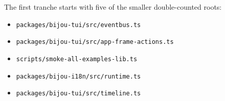The first tranche starts with five of the smaller double-counted roots:

\begin{itemize}
\tightlist
\item
  \texttt{p\allowbreak{}a\allowbreak{}c\allowbreak{}k\allowbreak{}a\allowbreak{}g\allowbreak{}e\allowbreak{}s\allowbreak{}/\allowbreak{}b\allowbreak{}i\allowbreak{}j\allowbreak{}o\allowbreak{}u\allowbreak{}-\allowbreak{}t\allowbreak{}u\allowbreak{}i\allowbreak{}/\allowbreak{}s\allowbreak{}r\allowbreak{}c\allowbreak{}/\allowbreak{}e\allowbreak{}v\allowbreak{}e\allowbreak{}n\allowbreak{}t\allowbreak{}b\allowbreak{}u\allowbreak{}s\allowbreak{}.\allowbreak{}t\allowbreak{}s}
\item
  \texttt{p\allowbreak{}a\allowbreak{}c\allowbreak{}k\allowbreak{}a\allowbreak{}g\allowbreak{}e\allowbreak{}s\allowbreak{}/\allowbreak{}b\allowbreak{}i\allowbreak{}j\allowbreak{}o\allowbreak{}u\allowbreak{}-\allowbreak{}t\allowbreak{}u\allowbreak{}i\allowbreak{}/\allowbreak{}s\allowbreak{}r\allowbreak{}c\allowbreak{}/\allowbreak{}a\allowbreak{}p\allowbreak{}p\allowbreak{}-\allowbreak{}f\allowbreak{}r\allowbreak{}a\allowbreak{}m\allowbreak{}e\allowbreak{}-\allowbreak{}a\allowbreak{}c\allowbreak{}t\allowbreak{}i\allowbreak{}o\allowbreak{}n\allowbreak{}s\allowbreak{}.\allowbreak{}t\allowbreak{}s}
\item
  \texttt{s\allowbreak{}c\allowbreak{}r\allowbreak{}i\allowbreak{}p\allowbreak{}t\allowbreak{}s\allowbreak{}/\allowbreak{}s\allowbreak{}m\allowbreak{}o\allowbreak{}k\allowbreak{}e\allowbreak{}-\allowbreak{}a\allowbreak{}l\allowbreak{}l\allowbreak{}-\allowbreak{}e\allowbreak{}x\allowbreak{}a\allowbreak{}m\allowbreak{}p\allowbreak{}l\allowbreak{}e\allowbreak{}s\allowbreak{}-\allowbreak{}l\allowbreak{}i\allowbreak{}b\allowbreak{}.\allowbreak{}t\allowbreak{}s}
\item
  \texttt{p\allowbreak{}a\allowbreak{}c\allowbreak{}k\allowbreak{}a\allowbreak{}g\allowbreak{}e\allowbreak{}s\allowbreak{}/\allowbreak{}b\allowbreak{}i\allowbreak{}j\allowbreak{}o\allowbreak{}u\allowbreak{}-\allowbreak{}i\allowbreak{}1\allowbreak{}8\allowbreak{}n\allowbreak{}/\allowbreak{}s\allowbreak{}r\allowbreak{}c\allowbreak{}/\allowbreak{}r\allowbreak{}u\allowbreak{}n\allowbreak{}t\allowbreak{}i\allowbreak{}m\allowbreak{}e\allowbreak{}.\allowbreak{}t\allowbreak{}s}
\item
  \texttt{p\allowbreak{}a\allowbreak{}c\allowbreak{}k\allowbreak{}a\allowbreak{}g\allowbreak{}e\allowbreak{}s\allowbreak{}/\allowbreak{}b\allowbreak{}i\allowbreak{}j\allowbreak{}o\allowbreak{}u\allowbreak{}-\allowbreak{}t\allowbreak{}u\allowbreak{}i\allowbreak{}/\allowbreak{}s\allowbreak{}r\allowbreak{}c\allowbreak{}/\allowbreak{}t\allowbreak{}i\allowbreak{}m\allowbreak{}e\allowbreak{}l\allowbreak{}i\allowbreak{}n\allowbreak{}e\allowbreak{}.\allowbreak{}t\allowbreak{}s}
\end{itemize}

